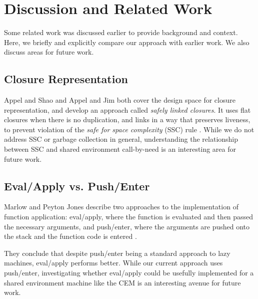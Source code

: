 \section{Discussion and Related Work} \label{sec:disc}

Some related work was discussed earlier to provide background and context. Here,
we briefly and explicitly compare our approach with earlier work. We also discuss
areas for future work.

\subsection{Closure Representation}
Appel and Shao \cite{shao1994space} and Appel and Jim \cite{appel1988optimizing}
both cover the design space for closure representation, and develop an approach
called \emph{safely linked closures}. It uses flat closures when
there is no duplication, and links in a way that preserves liveness, to prevent
violation of the \emph{safe for space complexity} (SSC) rule
\cite{appel1992compiling}. While we do not address SSC or garbage collection in
general, understanding the relationship between SSC and shared environment
call-by-need is an interesting area for future work.

\subsection{Eval/Apply vs. Push/Enter}
Marlow and Peyton Jones describe two approaches to the implementation of
function application: eval/apply, where the function is evaluated and then
passed the necessary arguments, and push/enter, where the arguments are pushed
onto the stack and the function code is entered \cite{marlow2006making}.

They conclude that despite push/enter being a standard approach to lazy
machines, eval/apply performs better. While our current approach uses
push/enter, investigating whether eval/apply could be usefully implemented for a
shared environment machine like the CEM is an interesting avenue for
future work.

